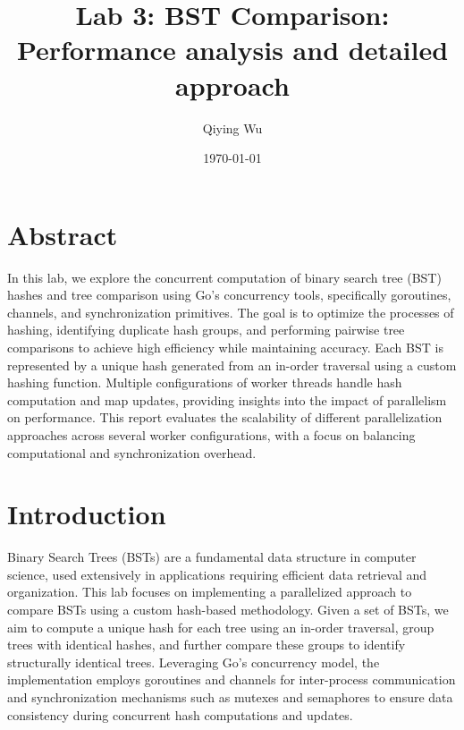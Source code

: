 \documentclass[letterpaper,12pt]{article}
\theoremstyle{remark}
\begin{document}
\title{Lab 3: BST Comparison: \\
\large 
Performance analysis and detailed approach
   }


\date{\today}
\author{Qiying Wu}
\maketitle





\section*{Abstract }

 In this lab, we explore the concurrent computation of binary search tree (BST) hashes and tree comparison using Go's concurrency tools, specifically goroutines, channels, and synchronization primitives. The goal is to optimize the processes of hashing, identifying duplicate hash groups, and performing pairwise tree comparisons to achieve high efficiency while maintaining accuracy. Each BST is represented by a unique hash generated from an in-order traversal using a custom hashing function. Multiple configurations of worker threads handle hash computation and map updates, providing insights into the impact of parallelism on performance. This report evaluates the scalability of different parallelization approaches across several worker configurations, with a focus on balancing computational and synchronization overhead.
 
\section*{Introduction }
Binary Search Trees (BSTs) are a fundamental data structure in computer science, used extensively in applications requiring efficient data retrieval and organization. This lab focuses on implementing a parallelized approach to compare BSTs using a custom hash-based methodology. Given a set of BSTs, we aim to compute a unique hash for each tree using an in-order traversal, group trees with identical hashes, and further compare these groups to identify structurally identical trees. Leveraging Go’s concurrency model, the implementation employs goroutines and channels for inter-process communication and synchronization mechanisms such as mutexes and semaphores to ensure data consistency during concurrent hash computations and updates.
\end{document}
